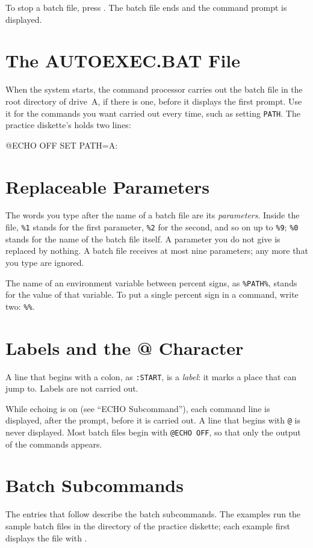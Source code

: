 To stop a batch file, press .  The batch file ends and the
command prompt is displayed.

\section{The AUTOEXEC.BAT File}
When the system starts, the command processor carries out the batch file
 in the root directory of drive~A, if there is one, before
it displays the first prompt.  Use it for the commands you want carried out
every time, such as setting \texttt{PATH}.  The practice diskette's
 holds two lines:
\begin{TypeIn}
@ECHO OFF
SET PATH=A:\APPS
\end{TypeIn}

\section{Replaceable Parameters}
The words you type after the name of a batch file are its
\emph{parameters}.  Inside the file, \texttt{\%1} stands for the first
parameter, \texttt{\%2} for the second, and so on up to \texttt{\%9};
\texttt{\%0} stands for the name of the batch file itself.  A parameter you
do not give is replaced by nothing.  A batch file receives at most nine
parameters; any more that you type are ignored.

The name of an environment variable between percent signs, as
\texttt{\%PATH\%}, stands for the value of that variable.  To put a single
percent sign in a command, write two: \texttt{\%\%}.

\section{Labels and the @ Character}
A line that begins with a colon, as \texttt{:START}, is a \emph{label}: it
marks a place that  can jump to.  Labels are not carried out.

While echoing is on (see ``ECHO Subcommand''), each command line is
displayed, after the prompt, before it is carried out.  A line that begins
with \texttt{@} is never displayed.  Most batch files begin with
\texttt{@ECHO OFF}, so that only the output of the commands appears.

\section{Batch Subcommands}
The entries that follow describe the batch subcommands.  The examples run
the sample batch files in the directory  of the practice
diskette; each example first displays the file with .

